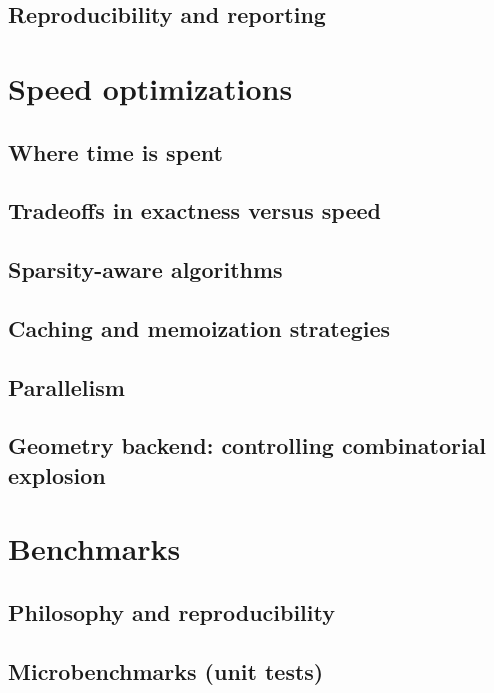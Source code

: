 \documentclass{article}
\newcommand{\<}{\langle}
\renewcommand{\>}{\rangle}
\theoremstyle{definition}
\theoremstyle{remark}
\begin{document}
	\subsection{Reproducibility and reporting}
	
	\section{Speed optimizations}
	
	\subsection{Where time is spent}
	
	\subsection{Tradeoffs in exactness versus speed}
	
	\subsection{Sparsity-aware algorithms}
	
	\subsection{Caching and memoization strategies}
	
	\subsection{Parallelism}
	
	\subsection{Geometry backend: controlling combinatorial explosion}
	
	\section{Benchmarks}
	
	\subsection{Philosophy and reproducibility}
	
	\subsection{Microbenchmarks (unit tests)}
	
\end{document}
